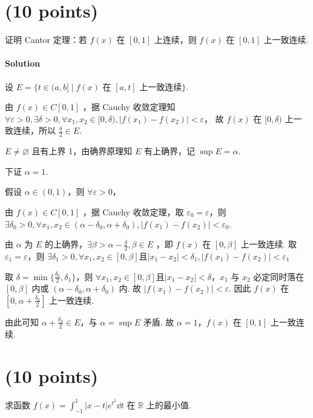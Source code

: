 \documentclass{ctexart}
\begin{document}
\section{(10 points)}
    证明 Cantor 定理：若 $f(x)$ 在 $[0,1]$ 上连续，则 $f(x)$ 在 $[0,1]$ 上一致连续.
\paragraph{Solution}

设 $E = \{ t\in (a,b] \mid f(x) \text{~在~}[a,t]\text{~上一致连续} \} $.

由 $f(x)\in C[0,1]$ ，据 Cauchy 收敛定理知 $\forall \varepsilon>0, \exists \delta>0, \forall x_1,x_2 \in [0,\delta), |f(x_1)-f(x_2)|<\varepsilon$，
故 $f(x)$ 在 $[0,\delta)$ 上一致连续，所以 $\frac{\delta}{2} \in E$.

$E\neq\varnothing$ 且有上界 1，由确界原理知 $E$ 有上确界，记 $\sup{E}=\alpha$.

下证 $\alpha=1$.

假设 $\alpha \in (0,1)$，则 $\forall \varepsilon>0$，

由 $f(x)\in C[0,1]$ ，据 Cauchy 收敛定理，取 $\varepsilon_0=\varepsilon$，则 $\exists \delta_0>0, \forall x_1,x_2 \in (\alpha-\delta_0,\alpha+\delta_0), |f(x_1)-f(x_2)|<\varepsilon_0$.

由 $\alpha$ 为 $E$ 的上确界，$\exists \beta>\alpha-\frac{\delta}{2}, \beta\in E$ ，即 $f(x)$ 在 $[0,\beta]$ 上一致连续.
取 $\varepsilon_1=\varepsilon$，则 $\exists \delta_1>0, \forall x_1,x_2 \in [0,\beta]$且$|x_1-x_2|<\delta_1, |f(x_1)-f(x_2)|<\varepsilon_1$

取 $\delta=\min\{\frac{\delta_0}{2},\delta_1\}$，则 $\forall x_1,x_2 \in [0,\beta]$且$|x_1-x_2|<\delta$，$x_1$ 与 $x_2$ 必定同时落在 $[0,\beta]$ 内或 $(\alpha-\delta_0,\alpha+\delta_0)$ 内.
故 $|f(x_1)-f(x_2)|<\varepsilon$. 因此 $f(x)$ 在 $[0,\alpha+\frac{\delta_0}{2}]$ 上一致连续.

由此可知 $\alpha+\frac{\delta_0}{2} \in E$，与 $\alpha=\sup E$ 矛盾. 故 $\alpha=1$，$f(x)$ 在 $[0,1]$ 上一致连续.

\section{(10 points)}
    求函数 $f(x)=\displaystyle\int_{-1}^1 |x-t|e^{t^2} \dd{t}$ 在 $\mathbb{R}$ 上的最小值.
\end{document}
